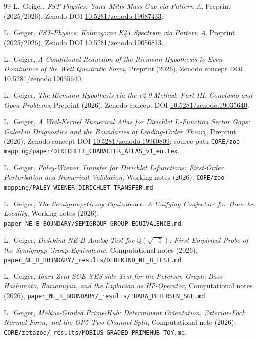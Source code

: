 \documentclass[11pt]{article}
\theoremstyle{definition}
\theoremstyle{remark}
\begin{document}
\begin{thebibliography}{99}
L.~Geiger, \emph{FST-Physics: Yang--Mills Mass Gap via Pattern A},
Preprint (2025/2026), Zenodo DOI
\href{https://doi.org/10.5281/zenodo.19087433}{10.5281/zenodo.19087433}.

L.~Geiger, \emph{FST-Physics: Kolmogorov K41 Spectrum via
Pattern A}, Preprint (2025/2026), Zenodo DOI
\href{https://doi.org/10.5281/zenodo.19056813}{10.5281/zenodo.19056813}.

L.~Geiger, \emph{A Conditional Reduction of the Riemann Hypothesis to
Even Dominance of the Weil Quadratic Form}, Preprint (2026),
Zenodo concept DOI
\href{https://doi.org/10.5281/zenodo.19035640}{10.5281/zenodo.19035640}.

L.~Geiger, \emph{The Riemann Hypothesis via the v2.0 Method,
Part III: Conclusio and Open Problems}, Preprint (2026),
Zenodo concept DOI
\href{https://doi.org/10.5281/zenodo.19035640}{10.5281/zenodo.19035640}.

L.~Geiger, \emph{A Weil-Kernel Numerical Atlas for Dirichlet
$L$-Function Sector Gaps: Galerkin Diagnostics and the Boundaries of
Leading-Order Theory}, Preprint (2026), Zenodo concept DOI
\href{https://doi.org/10.5281/zenodo.19960809}{10.5281/zenodo.19960809};
source path \texttt{CORE/zoo-mapping/paper/DIRICHLET\_CHARACTER\_ATLAS\_v1\_en.tex}.

L.~Geiger, \emph{Paley-Wiener Transfer for Dirichlet $L$-functions:
First-Order Perturbation and Numerical Validation}, Working notes
(2026),
\texttt{CORE/zoo-mapping/PALEY\_WIENER\_DIRICHLET\_TRANSFER.md}.

L.~Geiger, \emph{The Semigroup-Group Equivalence: A Unifying
Conjecture for Branch-Locality}, Working notes (2026),
\texttt{paper\_NE\_B\_BOUNDARY/SEMIGROUP\_GROUP\_EQUIVALENCE.md}.

L.~Geiger, \emph{Dedekind NE-B Analog Test for
$\mathbb{Q}(\sqrt{-5})$: First Empirical Probe of the
Semigroup-Group Equivalence}, Computational notes (2026),
\texttt{paper\_NE\_B\_BOUNDARY/\_results/DEDEKIND\_NE\_B\_TEST.md}.

L.~Geiger, \emph{Ihara-Zeta SGE YES-side Test for the Petersen
Graph: Bass-Hashimoto, Ramanujan, and the Laplacian as HP-Operator},
Computational notes (2026),
\texttt{paper\_NE\_B\_BOUNDARY/\_results/IHARA\_PETERSEN\_SGE.md}.

L.~Geiger, \emph{M\"obius-Graded Prime-Hub: Determinant Orientation,
Exterior-Fock Normal Form, and the OP5 Two-Channel Split},
Computational note (2026),
\texttt{CORE/zetazoo/\_results/MOBIUS\_GRADED\_PRIMEHUB\_TOY.md}.


\end{thebibliography}
\end{document}
